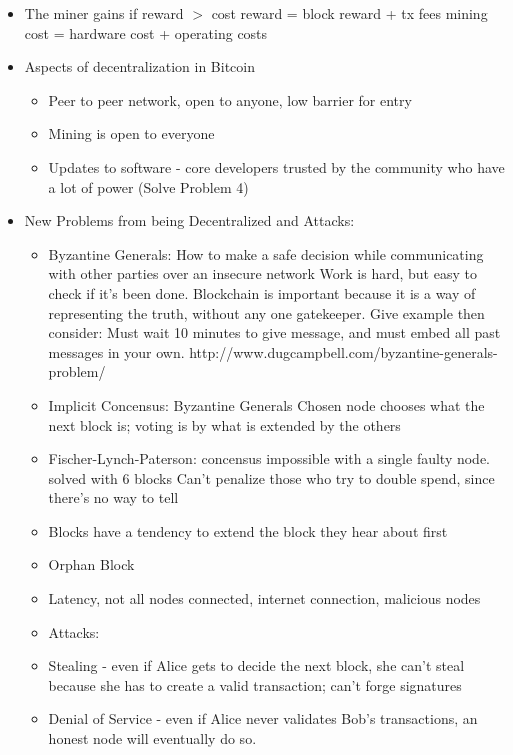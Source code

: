 \documentclass{article}
\begin{document}
\begin{itemize}
  \item The miner gains if reward $>$ cost
    \subitem reward = block reward + tx fees
    \subitem mining cost = hardware cost + operating costs
  \item Aspects of decentralization in Bitcoin
    \begin{itemize}
      \item Peer to peer network, open to anyone, low barrier for entry
      \item Mining is open to everyone
      \item Updates to software - core developers trusted by the community who have a lot of power (Solve Problem 4)
    \end{itemize}
  \item New Problems from being Decentralized and Attacks:
    \begin{itemize}
      \item Byzantine Generals: How to make a safe decision while communicating with other parties over an insecure network
        \subitem Work is hard, but easy to check if it's been done.
        \subitem Blockchain is important because it is a way of representing the truth, without any one gatekeeper.
        \subitem Give example then consider: Must wait 10 minutes to give message, and must embed all past messages in your own. 
        \subitem http://www.dugcampbell.com/byzantine-generals-problem/
      \item Implicit Concensus:
        \subitem Byzantine Generals
        \subitem Chosen node chooses what the next block is; voting is by what is extended by the others
      \item Fischer-Lynch-Paterson: concensus impossible with a single faulty node.\\
        solved with 6 blocks 
        \subitem Can't penalize those who try to double spend, since there's no way to tell
      \item Blocks have a tendency to extend the block they hear about first
      \item Orphan Block
      \item Latency, not all nodes connected, internet connection, malicious nodes
      \item Attacks:
      \item Stealing - even if Alice gets to decide the next block, she can't steal because she has to create
        a valid transaction; can't forge signatures
      \item Denial of Service - even if Alice never validates Bob's transactions, an honest node will eventually do so.

\end{itemize}
\end{itemize}
\end{document}
